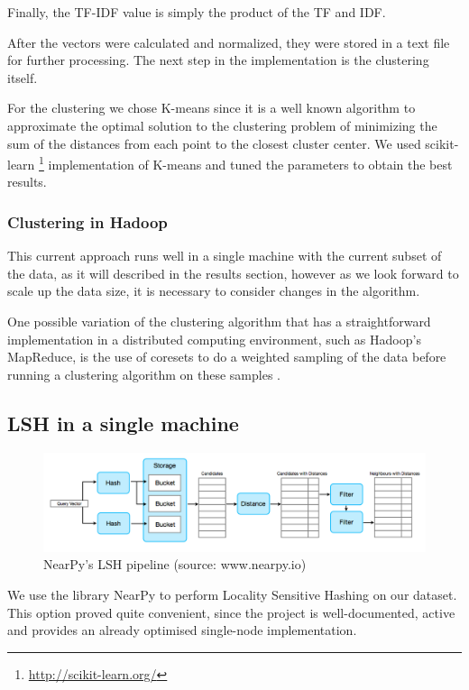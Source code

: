 \documentclass[10pt,a4paper]{scrartcl}
\begin{document}
      Finally, the TF-IDF value is simply the product of the TF and IDF.
      
      After the vectors were calculated and normalized, they were stored in
      a text file for further processing. The next step in the implementation
      is the clustering itself.
      
      For the clustering we chose K-means since it is a well known algorithm
      to approximate the optimal solution to the clustering problem
      of minimizing the sum of the distances from each point to the closest
      cluster center. We used scikit-learn
      \footnote{\url{http://scikit-learn.org/}} implementation of K-means and
      tuned the parameters to obtain the best results.

      \subsubsection{Clustering in Hadoop}
        This current approach runs well in a single machine with the current
        subset of the data, as it will described in the results section,
        however as we look forward to scale up the data size, it is necessary
        to consider changes in the algorithm.
        
        One possible variation of the clustering algorithm that has a
        straightforward implementation in a distributed computing environment,
        such as Hadoop's MapReduce, is the use of coresets to do a weighted
        sampling of the data before running a clustering algorithm on these
        samples \cite{feldman2011scalable}.
    \subsection{LSH in a single machine}
    \begin{figure}[htbp]
 	\centering
	 \includegraphics[scale=0.4]{img/lsh_pipeline.png}
 	\caption{NearPy's LSH pipeline (source: www.nearpy.io)}
	 \label{figure:lsh_pipeline}
      \end{figure}
    We use the library NearPy to perform Locality Sensitive Hashing on our dataset.
    This option proved quite convenient, since the project is well-documented, active and provides an already optimised single-node implementation.
    
\end{document}
